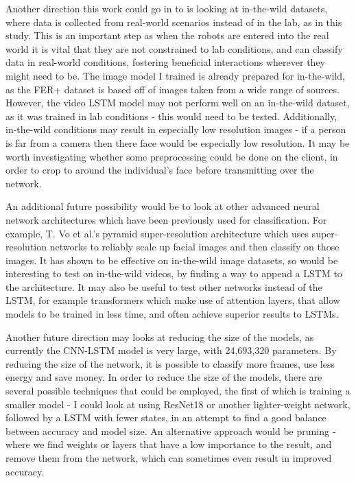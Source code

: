 \documentclass[sigconf]{acmart}
\begin{document}
{Another direction this work could go in to is looking at in-the-wild datasets,
where data is collected from real-world scenarios instead of in the lab, as in
this study. This is an important step as when the robots are entered into the
real world it is vital that they are not constrained to lab conditions, and
can classify data in real-world conditions, fostering beneficial interactions
wherever they might need to be. The image model I trained is already prepared
for in-the-wild, as the FER+ dataset is based off of images taken from a wide
range of sources. However, the video LSTM model may not perform well on an
in-the-wild dataset, as it was trained in lab conditions - this would need to
be tested. Additionally, in-the-wild conditions may result in especially low
resolution images - if a person is far from a camera then there face would be
especially low resolution. It may be worth investigating whether some
preprocessing could be done on the client, in order to crop to around the
individual's face before transmitting over the network.

An additional future possibility would be to look at other advanced neural
network architectures which have been previously used for classification.
For example, T. Vo et al.'s pyramid super-resolution architecture
\cite{vo2020pyramid} which uses super-resolution networks to reliably scale 
up facial images and then classify on those images. It has shown to be
effective on in-the-wild image datasets, so would be interesting to test on
in-the-wild videos, by finding a way to append a LSTM to the architecture. 
It may also be useful to test other networks instead of the LSTM, for
example transformers \cite{vaswani2017attention} which make use of attention
layers, that allow models to be trained in less time, and often achieve
superior results to LSTMs. 

Another future direction may looks at reducing the size of the models, as
currently the CNN-LSTM model is very large, with 24,693,320 parameters. 
By reducing the size
of the network, it is possible to classify more frames, use less energy
and save money. In order to reduce the size of the models, there are several
possible techniques that could be employed, the first of which is training a
smaller model - I could look at using ResNet18 or another lighter-weight
network, followed by a LSTM with fewer states, in an attempt to find a good
balance between accuracy and model size. An alternative approach would be
pruning - where we find weights or layers that have a low importance to the
result, and remove them from the network, which can sometimes even result in
improved accuracy.

}
\end{document}
